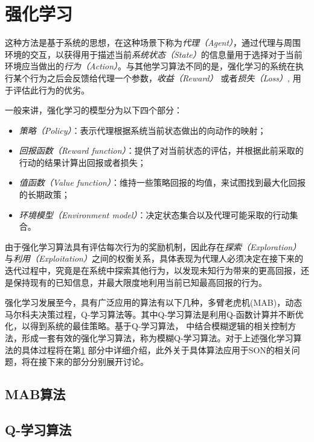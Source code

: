 \documentclass{IEEEtran}
\begin{document}
\section{强化学习}
\label{sec:RL}

这种方法是基于系统的思想，在这种场景下称为\emph{代理（Agent）}，通过代理与周围环境的交互，以获得用于描述当前\emph{系统状态（State）}的信息量用于选择对于当前环境应当做出的\emph{行为（Action）}。与其他学习算法不同的是，强化学习的系统在执行某个行为之后会反馈给代理一个参数，\emph{收益（Reward）} 或者\emph{损失（Loss）}, 用于评估此行为的优劣\cite{Sutton1998}。

一般来讲，强化学习的模型分为以下四个部分：
\begin{itemize}
\item \emph{策略（Policy）}：表示代理根据系统当前状态做出的向动作的映射；
\item \emph{回报函数（Reward function）}：提供了对当前状态的评估，并根据此前采取的行动的结果计算出回报或者损失；
\item \emph{值函数（Value function）}：维持一些策略回报的均值，来试图找到最大化回报的长期政策；
\item \emph{环境模型（Environment model）}：决定状态集合以及代理可能采取的行动集合。
\end{itemize}

由于强化学习算法具有评估每次行为的奖励机制，因此存在\emph{探索（Exploration）}与\emph{利用（Exploitation）}之间的权衡关系，具体表现为代理人必须决定在接下来的迭代过程中，究竟是在系统中探索其他行为，以发现未知行为带来的更高回报，还是保持现有的已知信息，并最大限度地利用当前已知最高回报的行为。

强化学习发展至今，具有广泛应用的算法有以下几种，多臂老虎机(MAB)，动态马尔科夫决策过程，Q-学习算法等。其中Q-学习算法是利用Q-函数计算并不断优化，以得到系统的最佳策略。基于Q-学习算法，\cite{Kaelbling1996} 中结合模糊逻辑的相关控制方法，形成一套有效的强化学习算法，称为模糊Q-学习算法。对于上述强化学习算法的具体过程将在第\ref{sec:RL} 部分中详细介绍，此外关于具体算法应用于SON的相关问题，将在接下来的部分分别展开讨论。

\subsection{MAB算法}


\subsection{Q-学习算法}
\end{document}
